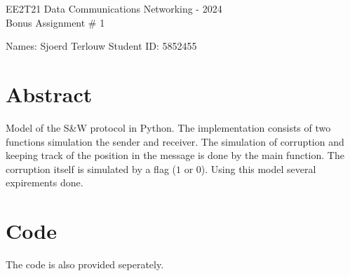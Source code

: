 \documentclass[11pt,fleqn]{article}
\begin{document}
	\begin{center}
		{\Large EE2T21 Data Communications Networking - 2024\\[0.1em]
			Bonus Assignment \# 1 \\}
	\end{center}

    \parbox[l][17mm][t]{\textwidth}{Names: Sjoerd Terlouw \hspace{6.66cm}
			Student ID: 5852455}
	\section{Abstract}
    Model of the S\&W protocol in Python. The implementation consists of two functions simulation the sender and receiver. The simulation of corruption and keeping track of the position in the message is done by the main function. The corruption itself is simulated by a flag ($1$ or $0$). 
    Using this model several expirements done.

    

    \newpage
    \section{Code}
    The code is also provided seperately.
    \inputminted[breaklines=true]{python3}{Stop-and-wait_protocol.py}
\end{document}
